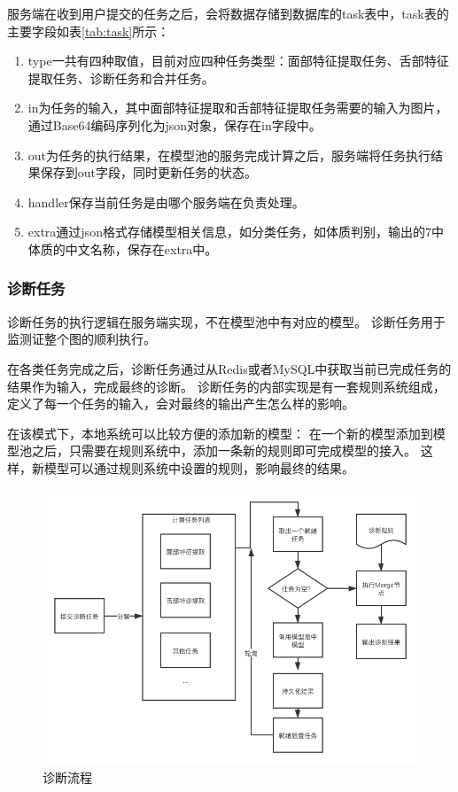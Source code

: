 服务端在收到用户提交的任务之后，会将数据存储到数据库的task表中，task表的主要字段如表\ref{tab:task}所示：
\begin{enumerate}
    
    \item type一共有四种取值，目前对应四种任务类型：面部特征提取任务、舌部特征提取任务、诊断任务和合并任务。

    \item in为任务的输入，其中面部特征提取和舌部特征提取任务需要的输入为图片，通过Base64编码序列化为json对象，保存在in字段中。

    \item out为任务的执行结果，在模型池的服务完成计算之后，服务端将任务执行结果保存到out字段，同时更新任务的状态。

    \item  handler保存当前任务是由哪个服务端在负责处理。

    \item extra通过json格式存储模型相关信息，如分类任务，如体质判别，输出的7中体质的中文名称，保存在extra中。
\end{enumerate}

\subsubsection{诊断任务}


诊断任务的执行逻辑在服务端实现，不在模型池中有对应的模型。 诊断任务用于监测证整个图的顺利执行。

在各类任务完成之后，诊断任务通过从Redis或者MySQL中获取当前已完成任务的结果作为输入，完成最终的诊断。 
诊断任务的内部实现是有一套规则系统组成，定义了每一个任务的输入，会对最终的输出产生怎么样的影响。

在该模式下，本地系统可以比较方便的添加新的模型： 在一个新的模型添加到模型池之后，只需要在规则系统中，添加一条新的规则即可完成模型的接入。
这样，新模型可以通过规则系统中设置的规则，影响最终的结果。

\begin{figure}[ht]
    \centering
    \includegraphics[width=12cm]{images/sketch2.png}
    \caption{诊断流程}
    \label{fig:sketch}
\end{figure}

